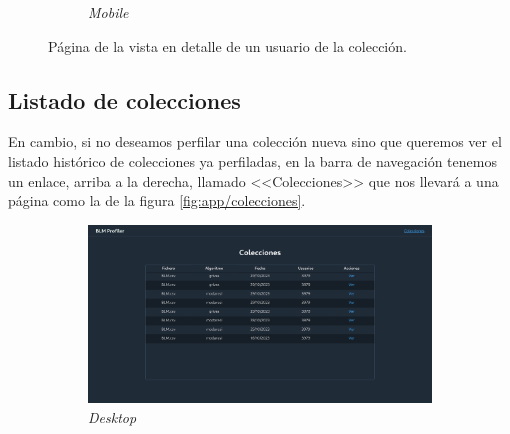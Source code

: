 \begin{figure}[H]
\begin{subfigure}{0.223\textwidth}
  \caption{\textit{Mobile}} 
  \end{subfigure}
  \caption{Página de la vista en detalle de un usuario de la colección.}
  \label{fig:app/user-info}
\end{figure}

\subsection{Listado de colecciones}
En cambio, si no deseamos perfilar una colección nueva sino que queremos ver el listado histórico de colecciones ya perfiladas, en la barra de navegación tenemos un enlace, arriba a la derecha, llamado <<Colecciones>> que nos llevará a una página como la de la figura \ref{fig:app/colecciones}. 

\begin{figure}[H]
  \centering
  \begin{subfigure}{0.7\textwidth}
   \includegraphics[width=\textwidth]{imaxes/capturas-app/desktop/colecciones.png}
  \caption{\textit{Desktop}} 
  \end{subfigure}
  \begin{subfigure}{0.2115\textwidth}

\end{subfigure}
\end{figure}

